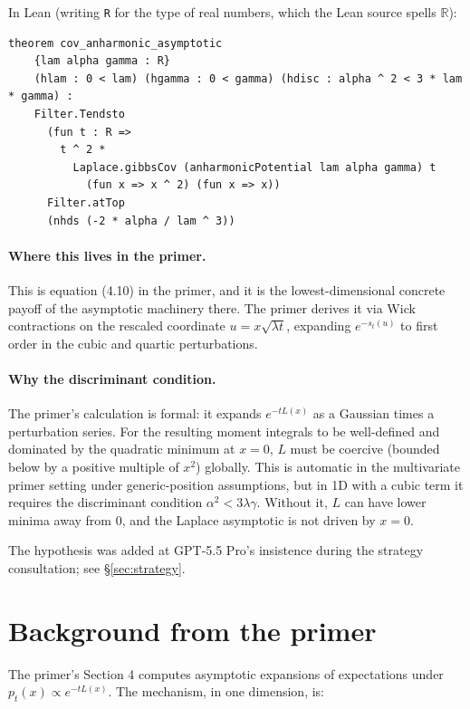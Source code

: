 \documentclass[11pt]{article}
\begin{document}
In Lean (writing \texttt{R} for the type of real numbers, which the
Lean source spells $\mathbb{R}$):
\begin{verbatim}
theorem cov_anharmonic_asymptotic
    {lam alpha gamma : R}
    (hlam : 0 < lam) (hgamma : 0 < gamma) (hdisc : alpha ^ 2 < 3 * lam * gamma) :
    Filter.Tendsto
      (fun t : R =>
        t ^ 2 *
          Laplace.gibbsCov (anharmonicPotential lam alpha gamma) t
            (fun x => x ^ 2) (fun x => x))
      Filter.atTop
      (nhds (-2 * alpha / lam ^ 3))
\end{verbatim}

\paragraph{Where this lives in the primer.} This is equation (4.10) in the
primer, and it is the lowest-dimensional concrete payoff of the asymptotic
machinery there. The primer derives it via Wick contractions on the
rescaled coordinate $u = x\sqrt{\lambda t}$, expanding $e^{-s_t(u)}$ to
first order in the cubic and quartic perturbations.

\paragraph{Why the discriminant condition.} The primer's calculation is
formal: it expands $e^{-tL(x)}$ as a Gaussian times a perturbation
series. For the resulting moment integrals to be well-defined and dominated
by the quadratic minimum at $x = 0$, $L$ must be coercive (bounded below
by a positive multiple of $x^2$) globally. This is automatic in the
multivariate primer setting under generic-position assumptions, but in 1D
with a cubic term it requires the discriminant condition
$\alpha^2 < 3\lambda\gamma$. Without it, $L$ can have lower minima away
from $0$, and the Laplace asymptotic is not driven by $x = 0$.

The hypothesis was added at GPT-5.5 Pro's insistence during the strategy
consultation; see \S\ref{sec:strategy}.

\section{Background from the primer}

The primer's Section 4 computes asymptotic expansions of expectations
under $p_t(x) \propto e^{-tL(x)}$. The mechanism, in one dimension, is:
\end{document}
